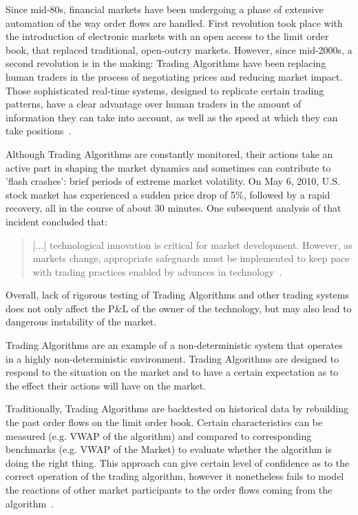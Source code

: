 Since mid-80s, financial markets have been undergoing a phase of extensive automation of the way order flows are handled. First revolution took place with the introduction of electronic markets with an open access to the limit order book, that replaced traditional, open-outcry markets. However, since mid-2000s, a second revolution is in the making: Trading Algorithms have been replacing human traders in the process of negotiating prices and reducing market impact. Those sophisticated real-time systems, designed to replicate certain trading patterns, have a clear advantage over human traders in the amount of information they can take into account, as well as the speed at which they can take positions~\cite{Lenglet}.

Although Trading Algorithms are constantly monitored, their actions take an active part in shaping the market dynamics and sometimes can contribute to 'flash crashes': brief periods of extreme market volatility. On May 6, 2010, U.S. stock market has experienced a sudden price drop of 5\%, followed by a rapid recovery, all in the course of about 30 minutes. One subsequent analysis of that incident concluded that:
\begin{quote}
[$\ldots$] technological innovation is critical for market development. However, as markets change, appropriate safeguards must be implemented to keep pace with trading practices enabled by advances in technology~\cite{Kirilenko2011}.
\end{quote}
Overall, lack of rigorous testing of Trading Algorithms and other trading systems does not only affect the P\&L  of the owner of the technology, but may also lead to dangerous instability of the market.

Trading Algorithms are an example of a non-deterministic system that operates in a highly non-deterministic environment. Trading Algorithms are designed to respond to the situation on the market and to have a certain expectation as to the effect their actions will have on the market.

Traditionally, Trading Algorithms are backtested on historical data by rebuilding the past order flows on the limit order book. Certain characteristics can be measured (e.g. VWAP of the algorithm) and compared to corresponding benchmarks (e.g. VWAP of the Market) to evaluate whether the algorithm is doing the right thing. This approach can give certain level of confidence as to the correct operation of the trading algorithm, however it nonetheless fails to model the reactions of other market participants to the order flows coming from the algorithm~\cite{Coggins2006}.

